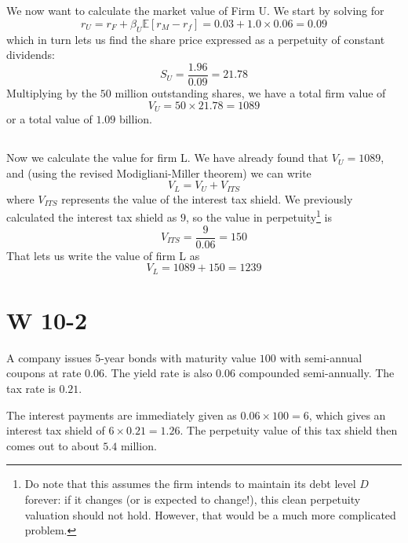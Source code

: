 \documentclass[12pt, letterpaper, parskip = full]{article}
\newcommand{\Ex}[1]{\mathbb{E}\left[#1\right]}
\begin{document}
    \subsection{}

    We now want to calculate the market value of Firm U. We start by solving for 
    \[ r_U = r_F + \beta_U \Ex{r_M - r_f} = 0.03 + 1.0 \times 0.06 = 0.09  \]
    which in turn lets us find the share price expressed as a perpetuity of constant dividends:
    \[ S_U = \frac{1.96}{0.09} = 21.78  \]
    Multiplying by the \(50\) million outstanding shares, we have a total firm value of 
    \[ V_U = 50 \times 21.78 = 1089   \]
    or a total value of \(1.09\) billion.

    \subsection{}

    Now we calculate the value for firm L. We have already found that \(V_U = 1089\), and (using the revised Modigliani-Miller theorem) we can write
    \[ V_L = V_U + V_{ITS}   \]
    where \(V_{ITS}\) represents the value of the interest tax shield. We previously calculated the interest tax shield as \(9\), so the value in perpetuity\footnote{Do note that this assumes the firm intends to maintain its debt level \(D\) forever: if it changes (or is expected to change!), this clean perpetuity valuation should not hold. However, that would be a much more complicated problem.} is 
    \[ V_{ITS} = \frac{9}{0.06} = 150 \]
    That lets us write the value of firm L as 
    \[ V_L = 1089 + 150 = 1239  \]

    \section{W 10-2}

    A company issues 5-year bonds with maturity value \(100\) with semi-annual coupons at rate \(0.06\). The yield rate is also \(0.06\) compounded semi-annually. The tax rate is \(0.21\).

    The interest payments are immediately given as \( 0.06 \times 100 = 6  \), which gives an interest tax shield of \(6 \times 0.21 = 1.26\). The perpetuity value of this tax shield then comes out to about \(5.4\) million.
    
\end{document}
